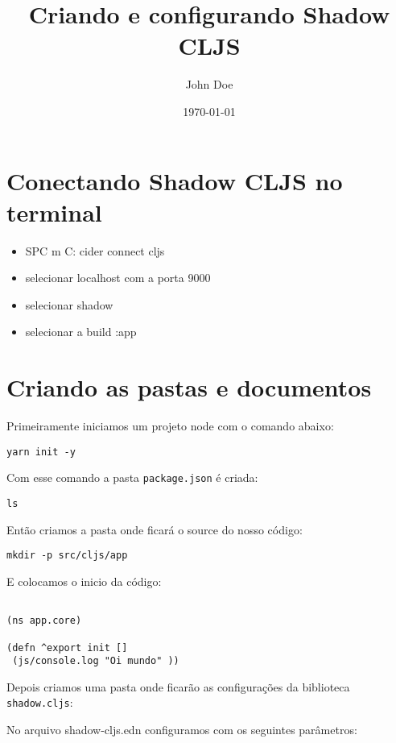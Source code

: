 \documentclass[11pt]{article}
\author{John Doe}
\date{\today}
\title{Criando e configurando Shadow CLJS}
\begin{document}
\maketitle
\tableofcontents


\section{Conectando Shadow CLJS no terminal}
\label{sec:org474c02a}
\begin{itemize}
\item SPC m C: cider connect cljs
\item selecionar localhost com a porta 9000
\item selecionar shadow
\item selecionar a build :app
\end{itemize}


\section{Criando as pastas e documentos}
\label{sec:orgb65807e}
Primeiramente iniciamos um projeto node com o comando abaixo:

\begin{verbatim}
yarn init -y
\end{verbatim}

Com esse comando a pasta \texttt{package.json} é criada:

\begin{verbatim}
ls
\end{verbatim}

Então criamos a pasta onde ficará o source do nosso código:

\begin{verbatim}
mkdir -p src/cljs/app
\end{verbatim}

E colocamos o inicio da código:

\begin{verbatim}

(ns app.core)

(defn ^export init []
 (js/console.log "Oi mundo" ))

\end{verbatim}

Depois criamos uma pasta onde ficarão as configurações da biblioteca \texttt{shadow.cljs}:


No arquivo shadow-cljs.edn configuramos com os seguintes parâmetros:
\end{document}
